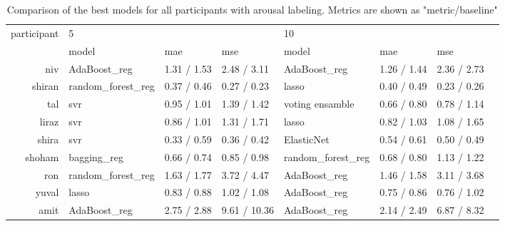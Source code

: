 \documentclass[../main.tex]{subfiles}
\begin{document}
\begin{table}[!h]
    \begin{tabular}{rlllllll}
        \toprule
        participant & \multicolumn{3}{l}{5} & \multicolumn{3}{l}{10} \\
              &               model & mae & mse &              model & mae & mse \\
        \midrule
             niv &       AdaBoost\_reg &         1.31 / 1.53 &        2.48 / 3.11 &       AdaBoost\_reg &         1.26 / 1.44 &        2.36 / 2.73 \\
          shiran &  random\_forest\_reg &         0.37 / 0.46 &        0.27 / 0.23 &              lasso &         0.40 / 0.49 &        0.23 / 0.26 \\
             tal &                svr &         0.95 / 1.01 &        1.39 / 1.42 &    voting ensamble &         0.66 / 0.80 &        0.78 / 1.14 \\
           liraz &                svr &         0.86 / 1.01 &        1.31 / 1.71 &              lasso &         0.82 / 1.03 &        1.08 / 1.65 \\
           shira &                svr &         0.33 / 0.59 &        0.36 / 0.42 &         ElasticNet &         0.54 / 0.61 &        0.50 / 0.49 \\
          shoham &        bagging\_reg &         0.66 / 0.74 &        0.85 / 0.98 &  random\_forest\_reg &         0.68 / 0.80 &        1.13 / 1.22 \\
             ron &  random\_forest\_reg &         1.63 / 1.77 &        3.72 / 4.47 &       AdaBoost\_reg &         1.46 / 1.58 &        3.11 / 3.68 \\
           yuval &              lasso &         0.83 / 0.88 &        1.02 / 1.08 &       AdaBoost\_reg &         0.75 / 0.86 &        0.76 / 1.02 \\
            amit &       AdaBoost\_reg &         2.75 / 2.88 &       9.61 / 10.36 &       AdaBoost\_reg &         2.14 / 2.49 &        6.87 / 8.32 \\
        \bottomrule
    \end{tabular}
    \caption{Comparison of the best models for all participants with arousal labeling. Metrics are shown as "metric/baseline"}  
\end{table}
\end{document}
